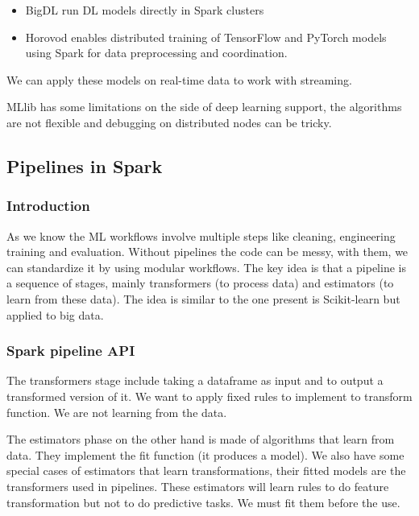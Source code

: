 \begin{itemize}
    \item BigDL \ra run DL models directly in Spark clusters
    \item Horovod \ra enables distributed training of TensorFlow and PyTorch models using Spark for data preprocessing and coordination.
\end{itemize}

We can apply these models on real-time data to work with streaming. 

\vspace{10pt}

MLlib has some limitations on the side of deep learning support, the algorithms are not flexible and debugging on distributed nodes can be tricky. 

\subsection{Pipelines in Spark}


\subsubsection{Introduction}

As we know the ML workflows involve multiple steps like cleaning, engineering training and evaluation. Without pipelines the code can be messy, with them, we can standardize it by using modular workflows. The key idea is that a pipeline is a sequence of stages, mainly transformers (to process data) and estimators (to learn from these data). The idea is similar to the one present is Scikit-learn but applied to big data.


\subsubsection{Spark pipeline API}


The transformers stage include taking a dataframe as input and to output a transformed version of it. We want to apply fixed rules to implement to transform function. We are not learning from the data. 

\vspace{10pt}

The estimators phase on the other hand is made of algorithms that learn from data. They implement the fit function (it produces a model). We also have some special cases of estimators that learn transformations, their fitted models are the transformers used in pipelines. These estimators will learn rules to do feature transformation but not to do predictive tasks. We must fit them before the use. 


